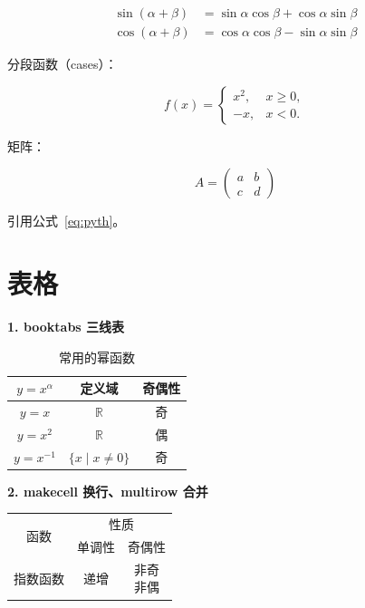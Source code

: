 \documentclass[lang=cn,newtx,10pt,scheme=chinese,nofont]{elegantbook}
\begin{document}
\begin{align}
    \sin(\alpha+\beta) &= \sin\alpha\cos\beta+\cos\alpha\sin\beta \label{eq:sinadd}\\
    \cos(\alpha+\beta) &= \cos\alpha\cos\beta-\sin\alpha\sin\beta
\end{align}

分段函数（cases）：

\[
f(x)=\begin{cases}
    x^2, & x \geq 0,\\
    -x,  & x < 0.
\end{cases}
\]

矩阵：

\[
A=\begin{pmatrix} a & b \\ c & d \end{pmatrix}
\]

引用公式~\eqref{eq:pyth}。

\section{表格}

\textbf{1. booktabs 三线表}

\begin{table}[htbp]
    \centering
    \caption{常用的幂函数}
    \begin{tabular}{ccc}
        \toprule
        $y=x^\alpha$ & 定义域 & 奇偶性 \\
        \midrule
        $y=x$     & $\mathbb{R}$        & 奇 \\
        $y=x^2$   & $\mathbb{R}$        & 偶 \\
        $y=x^{-1}$& $\{x \mid x \neq 0\}$ & 奇 \\
        \bottomrule
    \end{tabular}
\end{table}

\textbf{2. makecell 换行、multirow 合并}

\begin{table}[htbp]
    \centering
    \begin{tabular}{|c|c|c|}
        \hline
        \multirow{2}{*}{函数} & \multicolumn{2}{c|}{性质} \\
        \cline{2-3}
         & 单调性 & 奇偶性 \\
        \hline
        指数函数 & 递增 & \makecell{非奇\\非偶} \\
        \hline
    \end{tabular}
\end{table}
\end{document}
